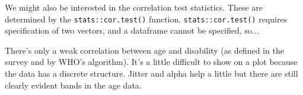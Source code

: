 \documentclass[titlepage]{book}\usepackage{knitr}
\begin{document}
\begin{knitrout}
\color{fgcolor}
\end{knitrout}


\begin{knitrout}
\color{fgcolor}
\end{knitrout}

We might also be interested in the correlation test statistics.  These are determined by the \texttt{stats::cor.test()}
function.  \texttt{stats::cor.test()} requires specification of two vectors, and a dataframe cannot be specified, so...

\begin{knitrout}
\color{fgcolor}\begin{kframe}
\begin{alltt}
  \hlopt{$}\hlopt{$}  \hlstd{=} \hlstd{)}
\end{alltt}
\end{kframe}
\end{knitrout}


There's only a weak correlation between age and disability (as defined in the survey and by WHO's algorithm). It's a little difficult to show on a plot because the data has a discrete structure.  Jitter and alpha help a little but there are still clearly evident bands in the age data.
\end{document}
